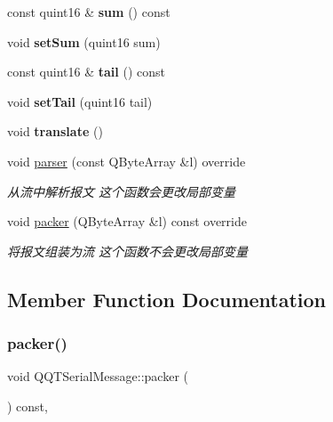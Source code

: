 \begin{DoxyCompactItemize}
const quint16 \& {\bfseries sum} () const
\item 
\mbox{\label{class_q_q_t_serial_message_a874b1dfaf6194e189b11187400761d79}} 
void {\bfseries set\+Sum} (quint16 sum)
\item 
\mbox{\label{class_q_q_t_serial_message_ae1121a8897700f94b65aff565a697898}} 
const quint16 \& {\bfseries tail} () const
\item 
\mbox{\label{class_q_q_t_serial_message_a83aa4a30d8a174101a54734c93940602}} 
void {\bfseries set\+Tail} (quint16 tail)
\item 
\mbox{\label{class_q_q_t_serial_message_a8f64987674587b52f66493d2a67e5cd8}} 
void {\bfseries translate} ()
\item 
void \mbox{\hyperlink{class_q_q_t_serial_message_a9533887dc0566c5ee16990b323df94ef}{parser}} (const Q\+Byte\+Array \&l) override
\begin{DoxyCompactList}\small\item\em 从流中解析报文 这个函数会更改局部变量 \end{DoxyCompactList}\item 
void \mbox{\hyperlink{class_q_q_t_serial_message_a4f677828bfdb05d584c761413b6c15bc}{packer}} (Q\+Byte\+Array \&l) const override
\begin{DoxyCompactList}\small\item\em 将报文组装为流 这个函数不会更改局部变量 \end{DoxyCompactList}\end{DoxyCompactItemize}


\subsection{Member Function Documentation}
\mbox{\label{class_q_q_t_serial_message_a4f677828bfdb05d584c761413b6c15bc}} 
\subsubsection{\texorpdfstring{packer()}{packer()}}
{\footnotesize\ttfamily void Q\+Q\+T\+Serial\+Message\+::packer (\begin{DoxyParamCaption}\item[{Q\+Byte\+Array \&}]{ }\end{DoxyParamCaption}) const\hspace{0.3cm}{\ttfamily [override]}, {\ttfamily [virtual]}}



